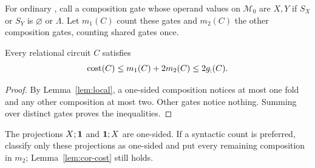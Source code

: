 For ordinary \CoR, call a composition gate whose operand values on
$\mathcal M_0$ are $X,Y$  if $S_X$ or $S_Y$ is
$\varnothing$ or $\Lambda$. Let
$m_1(C)$ count these gates and $m_2(C)$ the other composition gates,
counting shared gates once.
\begin{lemma}\label{lem:cor-cost}
Every relational circuit $C$ satisfies
\[
 \operatorname{cost}(C)\le m_1(C)+2m_2(C)\le2g_{;}(C).
\]
\end{lemma}
\begin{proof}
By Lemma~\ref{lem:local}, a one-sided composition notices at most one
fold and any other composition at most two. Other gates notice nothing.
Summing over distinct gates proves the inequalities.
\end{proof}
The projections $X;\mathbf{1}$ and $\mathbf{1};X$ are one-sided. If a syntactic count
is preferred, classify only these projections as one-sided and put every
remaining composition in $m_2$; Lemma~\ref{lem:cor-cost} still holds.
